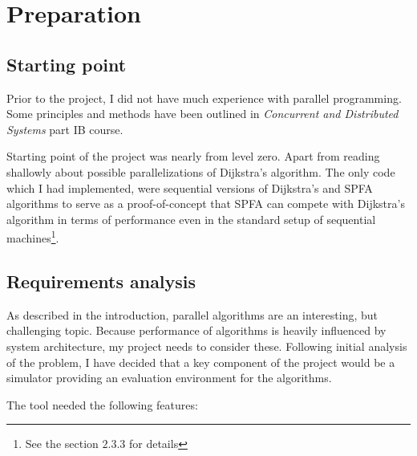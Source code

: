 \documentclass[12pt,a4paper,twoside,openright]{report}
\begin{document}
\chapter{Preparation}
\section{Starting point}
Prior to the project, I did not have much experience with parallel programming. Some principles and methods have been outlined in \textit{Concurrent and Distributed Systems} part IB course.

Starting point of the project was nearly from level zero. Apart from reading shallowly about possible parallelizations of Dijkstra's algorithm. The only code which I had implemented, were sequential versions of Dijkstra's and SPFA algorithms to serve as a proof-of-concept that SPFA can compete with Dijkstra's algorithm in terms of performance even in the standard setup of sequential machines\footnote{See the section $2.3.3$ for details}.

\section{Requirements analysis}
As described in the introduction, parallel algorithms are an interesting, but challenging topic. Because performance of algorithms is heavily influenced by system architecture, my project needs to consider these. Following initial analysis of the problem, I have decided that a key component of the project would be a simulator providing an evaluation environment for the algorithms.

The tool needed the following features:
\end{document}
